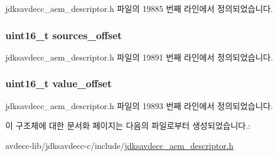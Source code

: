 jdksavdecc\+\_\+aem\+\_\+descriptor.\+h 파일의 19885 번째 라인에서 정의되었습니다.

\subsubsection[{\texorpdfstring{sources\+\_\+offset}{sources_offset}}]{\setlength{\rightskip}{0pt plus 5cm}uint16\+\_\+t sources\+\_\+offset}\hypertarget{structjdksavdecc__descriptor__mixer_ac9ce4e1b642e6654d49504898dbe738d}{}\label{structjdksavdecc__descriptor__mixer_ac9ce4e1b642e6654d49504898dbe738d}


jdksavdecc\+\_\+aem\+\_\+descriptor.\+h 파일의 19891 번째 라인에서 정의되었습니다.

\subsubsection[{\texorpdfstring{value\+\_\+offset}{value_offset}}]{\setlength{\rightskip}{0pt plus 5cm}uint16\+\_\+t value\+\_\+offset}\hypertarget{structjdksavdecc__descriptor__mixer_a67b64485005415f9a58a25736aa8def1}{}\label{structjdksavdecc__descriptor__mixer_a67b64485005415f9a58a25736aa8def1}


jdksavdecc\+\_\+aem\+\_\+descriptor.\+h 파일의 19893 번째 라인에서 정의되었습니다.



이 구조체에 대한 문서화 페이지는 다음의 파일로부터 생성되었습니다.\+:\begin{DoxyCompactItemize}
\item 
avdecc-\/lib/jdksavdecc-\/c/include/\hyperlink{jdksavdecc__aem__descriptor_8h}{jdksavdecc\+\_\+aem\+\_\+descriptor.\+h}\end{DoxyCompactItemize}

